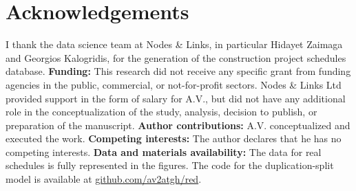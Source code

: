 \documentclass[11pt]{article}
\begin{document}
\section*{Acknowledgements}

I thank the data science team at Nodes \& Links, in particular Hidayet Zaimaga and Georgios Kalogridis, for the generation of the construction project schedules database. 
%
{\bf Funding:} This research did not receive any specific grant from funding agencies in the public, commercial, or not-for-profit sectors. Nodes \& Links Ltd provided support in the form of salary for A.V., but did not have any additional role in the conceptualization of the study, analysis, decision to publish, or preparation of the manuscript.
%
{\bf Author contributions:} A.V. conceptualized and executed the work.
%
{\bf Competing interests:} The author declares that he has no competing interests.
%
{\bf Data and materials availability:} The data for real schedules is fully represented in the figures. The code for the duplication-split model is available at \href{https://github.com/av2atgh/red}{github.com/av2atgh/red}.




%


\end{document}
